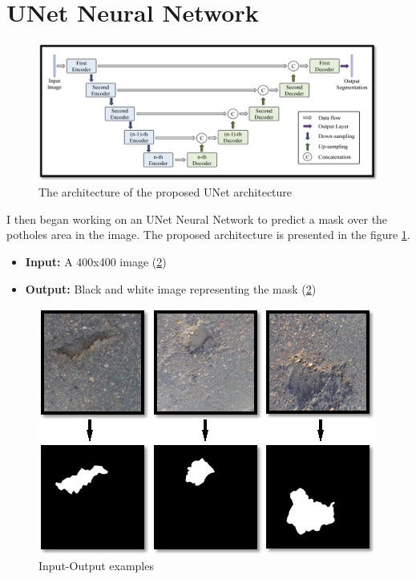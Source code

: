 \documentclass[runningheads,a4paper,11pt]{report}
\begin{document}
\newpage
\section{UNet Neural Network}
\label{section:uNet}

\begin{figure}[htbp]
    \centerline{\includegraphics{assets/uNetArchitecture.png}}  
    \caption{The architecture of the proposed UNet architecture}
    \label{uNetArchitecture}
\end{figure}

I then began working on an UNet Neural Network to predict a mask over the potholes area in the image. The proposed architecture is presented in the figure \ref{uNetArchitecture}.
\begin{itemize}
	\item \textbf{Input:} A 400x400 image (\ref{uNetExamples})
	\item \textbf{Output:} Black and white image representing the mask (\ref{uNetExamples})
\end{itemize}

\begin{figure}[htbp]
    \centerline{\includegraphics{assets/uNetExamples.png}}  
    \caption{Input-Output examples}
    \label{uNetExamples}
\end{figure}
\end{document}
